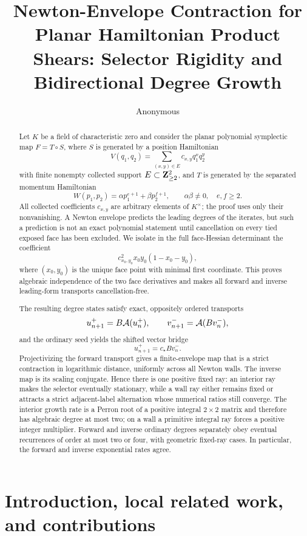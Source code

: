\documentclass[11pt]{article}
\title{Newton-Envelope Contraction for Planar Hamiltonian Product Shears: Selector Rigidity and Bidirectional Degree Growth}
\author{Anonymous}
\date{}
\theoremstyle{definition}
\theoremstyle{remark}
\begin{document}
\maketitle

\begin{abstract}
Let \(K\) be a field of characteristic zero and consider the planar polynomial
symplectic map \(F=T\circ S\), where \(S\) is generated by a position
Hamiltonian
\[
V(q_1,q_2)=\sum_{(x,y)\in E}c_{x,y}q_1^xq_2^y
\]
with finite nonempty collected support \(E\subset\mathbf{Z}_{\geq2}^2\), and \(T\)
is generated by the separated momentum Hamiltonian
\[
W(p_1,p_2)=\alpha p_1^{e+1}+\beta p_2^{f+1},
\qquad \alpha\beta\neq0,\quad e,f\geq2.
\]
All collected coefficients \(c_{x,y}\) are arbitrary elements of
\(K^\times\); the proof uses only their nonvanishing.  A Newton envelope
predicts the leading degrees of the iterates, but such a prediction is not
an exact polynomial statement until cancellation on every tied exposed
face has been excluded.  We isolate in the full face-Hessian determinant
the coefficient
\[
c_{x_0,y_0}^2x_0y_0(1-x_0-y_0),
\]
where \((x_0,y_0)\) is the unique face point with minimal first coordinate.
This proves algebraic independence of the two face derivatives and makes
all forward and inverse leading-form transports cancellation-free.

The resulting degree states satisfy exact, oppositely ordered transports
\[
u^+_{n+1}=B\mathcal{A}(u^+_n),\qquad
v^-_{n+1}=\mathcal{A}(Bv^-_n),
\]
and the ordinary seed yields the shifted vector bridge
\[
u^+_{n+1}=c_\star Bv^-_n.
\]
Projectivizing the forward transport gives a finite-envelope map that is a
strict contraction in logarithmic distance, uniformly across all Newton
walls.  The inverse map is its scaling conjugate.  Hence there is one
positive fixed ray: an interior ray makes the selector eventually
stationary, while a wall ray either remains fixed or attracts a strict
adjacent-label alternation whose numerical ratios still converge.  The
interior growth rate is a Perron root of a positive integral
\(2\times2\) matrix and therefore has algebraic degree at most two; on a
wall a primitive integral ray forces a positive integer multiplier.
Forward and inverse ordinary degrees separately obey eventual recurrences
of order at most two or four, with geometric fixed-ray cases.  In
particular, the forward and inverse exponential rates agree.
\end{abstract}

\section{Introduction, local related work, and contributions}
\end{document}
